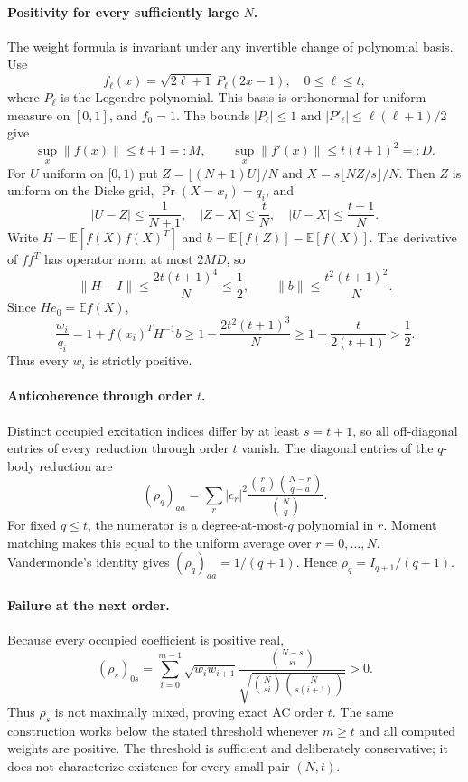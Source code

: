 \documentclass[11pt]{article}
\begin{document}
\paragraph{Positivity for every sufficiently large $N$.}
The weight formula is invariant under any invertible change of polynomial basis. Use
\[
f_\ell(x)=\sqrt{2\ell+1}\,P_\ell(2x-1),\quad0\le\ell\le t,
\]
where $P_\ell$ is the Legendre polynomial. This basis is orthonormal for uniform measure on $[0,1]$, and $f_0=1$. The bounds $|P_\ell|\le1$ and $|P'_\ell|\le\ell(\ell+1)/2$ give
\[
\sup_x\|f(x)\|\le t+1=:M,\qquad
\sup_x\|f'(x)\|\le t(t+1)^2=:D.
\]
For $U$ uniform on $[0,1)$ put $Z=\lfloor(N+1)U\rfloor/N$ and $X=s\lfloor NZ/s\rfloor/N$. Then $Z$ is uniform on the Dicke grid, $\Pr(X=x_i)=q_i$, and
\[
|U-Z|\le\frac1{N+1},\quad |Z-X|\le\frac tN,\quad |U-X|\le\frac{t+1}N.
\]
Write $H=\mathbb E[f(X)f(X)^T]$ and $b=\mathbb E[f(Z)]-\mathbb E[f(X)]$. The derivative of $ff^T$ has operator norm at most $2MD$, so
\[
\|H-I\|\le\frac{2t(t+1)^4}{N}\le\frac12,\qquad
\|b\|\le\frac{t^2(t+1)^2}{N}.
\]
Since $He_0=\mathbb E f(X)$,
\[
\frac{w_i}{q_i}=1+f(x_i)^TH^{-1}b
\ge1-\frac{2t^2(t+1)^3}{N}
\ge1-\frac{t}{2(t+1)}>\frac12.
\]
Thus every $w_i$ is strictly positive.

\paragraph{Anticoherence through order $t$.}
Distinct occupied excitation indices differ by at least $s=t+1$, so all off-diagonal entries of every reduction through order $t$ vanish. The diagonal entries of the $q$-body reduction are
\[
(\rho_q)_{aa}=\sum_r |c_r|^2
\frac{\binom ra\binom{N-r}{q-a}}{\binom Nq}.
\]
For fixed $q\le t$, the numerator is a degree-at-most-$q$ polynomial in $r$. Moment matching makes this equal to the uniform average over $r=0,\ldots,N$. Vandermonde's identity gives $(\rho_q)_{aa}=1/(q+1)$. Hence $\rho_q=I_{q+1}/(q+1)$.

\paragraph{Failure at the next order.}
Because every occupied coefficient is positive real,
\[
(\rho_s)_{0s}=\sum_{i=0}^{m-1}\sqrt{w_iw_{i+1}}
\frac{\binom{N-s}{si}}{\sqrt{\binom N{si}\binom N{s(i+1)}}}>0.
\]
Thus $\rho_s$ is not maximally mixed, proving exact AC order $t$. The same construction works below the stated threshold whenever $m\ge t$ and all computed weights are positive. The threshold is sufficient and deliberately conservative; it does not characterize existence for every small pair $(N,t)$.
\end{document}
